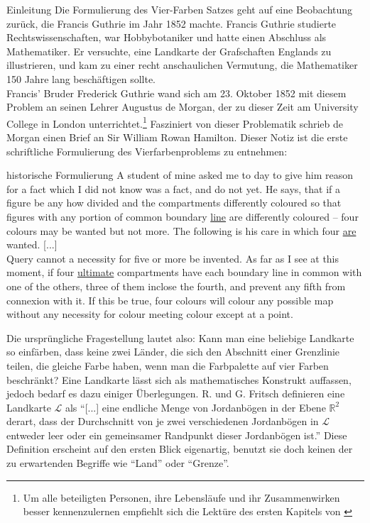 \begin{chapter}{Einleitung}
 Die Formulierung des Vier-Farben Satzes geht auf eine Beobachtung zurück, die Francis Guthrie im Jahr 1852 machte. Francis Guthrie studierte Rechtswissenschaften, war Hobbybotaniker und hatte einen Abschluss als Mathematiker. Er versuchte, eine Landkarte der Grafschaften Englands zu illustrieren, und kam zu einer recht anschaulichen Vermutung, die Mathematiker 150 Jahre lang beschäftigen sollte. \\
 Francis' Bruder Frederick Guthrie wand sich am 23. Oktober 1852 mit diesem Problem an seinen Lehrer Augustus de Morgan, der zu dieser Zeit am University College in London unterrichtet.\footnote{Um alle beteiligten Personen, ihre Lebensläufe und ihr Zusammenwirken besser kennenzulernen empfiehlt sich die Lektüre des ersten Kapitels von \cite{fritsch}} Fasziniert von dieser Problematik schrieb de Morgan einen Brief an Sir William Rowan Hamilton. Dieser Notiz ist die erste schriftliche Formulierung des Vierfarbenproblems zu entnehmen:
 
 \begin{satz}{historische Formulierung}
  A student of mine asked me to day to give him reason for a fact which I did not know was a fact, and do not yet. He says, that if a figure be any how divided and the compartments differently coloured so that figures with any portion of common boundary \underline{line} are differently coloured -- four colours may be wanted but not more. The following is his care in which four \underline{are} wanted. [...]\\
  Query cannot a necessity for five or more be invented. As far as I see at this moment, if four \underline{ultimate} compartments have each boundary line in common with one of the others, three of them inclose the fourth, and prevent any fifth from connexion with it. If this be true, four colours will colour any possible map without any necessity for colour meeting colour except at a point. \cite{fritsch}
 \end{satz}
 
 Die ursprüngliche Fragestellung lautet also: Kann man eine beliebige Landkarte so einfärben, dass keine zwei Länder, die sich den Abschnitt einer Grenzlinie teilen, die gleiche Farbe haben, wenn man die Farbpalette auf vier Farben beschränkt? Eine Landkarte lässt sich als mathematisches Konstrukt auffassen, jedoch bedarf es dazu einiger Überlegungen. R. und G. Fritsch definieren eine Landkarte $\mathcal{L}$ als ``[...] eine endliche Menge von Jordanbögen in der Ebene $\mathbb{R}^2$ derart, dass der Durchschnitt von je zwei verschiedenen Jordanbögen in $\mathcal{L}$ entweder leer oder ein gemeinsamer Randpunkt dieser Jordanbögen ist.'' \cite{fritsch} Diese Definition erscheint auf den ersten Blick eigenartig, benutzt sie doch keinen der zu erwartenden Begriffe wie ``Land'' oder ``Grenze''. 
 

\end{chapter}
